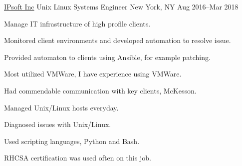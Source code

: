 


\begin{cventries}

\cventry
    {\href{www.ipsoft.com}{IPsoft Inc}}
    {Unix Linux Systems Engineer}
    {New York, NY}
    {Aug 2016--Mar 2018}
    {
    \begin{cvitems}
        \item Manage IT infrastructure of high profile clients.
        \item Monitored client environments and developed automation to resolve issue.
        \item Provided automaton to clients using Ansible, for example patching.
        \item Most utilized VMWare, I have experience using VMWare.
        \item Had commendable communication with key clients, McKesson.
        \item Managed Unix/Linux hosts everyday.
        \item Diagnosed issues with Unix/Linux.
        \item Used scripting languages, Python and Bash.
        \item RHCSA certification was used often on this job.
    \end{cvitems}
    }


\end{cventries}
